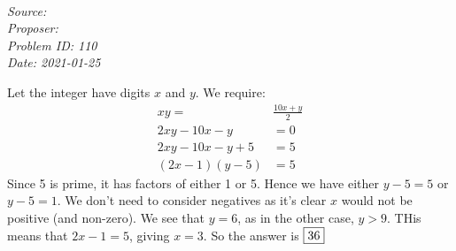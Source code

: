 \SSbreak\\
\emph{Source: \Cfolk}\\
\emph{Proposer: \Pss}\\
\emph{Problem ID: 110}\\
\emph{Date: 2021-01-25}\\
\SSbreak

\bigskip

\begin{solution}\hfil\medskip

  Let the integer have digits \(x\) and \(y\). We require:
  \begin{align*}
    xy=&\frac{10x+y}{2}\\
    2xy-10x-y&=0\\
    2xy-10x-y+5&=5\\
    (2x-1)(y-5)&=5
  \end{align*}
Since 5 is prime, it has factors of either 1 or 5. Hence we have either \(y-5=5\) or \(y-5=1\). We don't need to consider negatives as it's clear \(x\) would not be positive (and non-zero). We see that \(y=6\), as in the other case, \(y>9\). THis means that \(2x-1=5\), giving \(x=3\). So the answer is \(\fbox{36}\)
\end{solution}\bigskip
